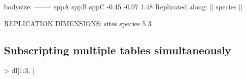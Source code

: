\documentclass{beamer}
\numberwithin{exercise}{section}
\begin{document}
\begin{frame}[fragile]
\begin{Schunk}
\begin{Soutput}
bodysize:
--------
 sppA  sppB  sppC 
-0.45 -0.07  1.48 
Replicated along:  || species || 


REPLICATION DIMENSIONS: 
  sites species 
      5       3 
\end{Soutput}
\end{Schunk}
\end{frame}

\subsection[Subscripting]{Subscripting multiple tables simultaneously}


\begin{frame}[fragile]
\begin{Schunk}
\begin{Sinput}
> dl[1:3, ]
\end{Sinput}
\end{Schunk}
\end{frame}
\end{document}
